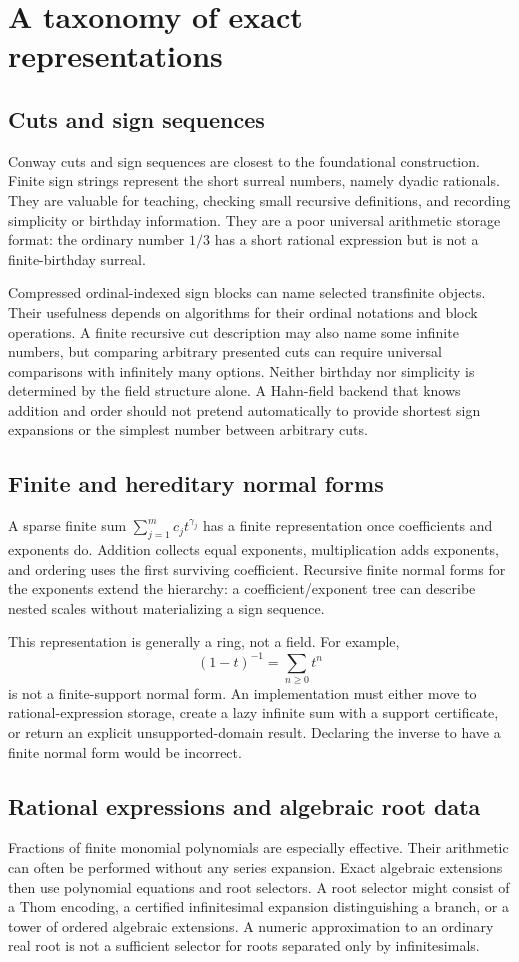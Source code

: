 \documentclass[11pt,letterpaper]{article}
\theoremstyle{definition}
\numberwithin{equation}{section}
\begin{document}
\section{A taxonomy of exact representations}\label{sec:representations}
\subsection{Cuts and sign sequences}
Conway cuts and sign sequences are closest to the foundational construction. Finite sign strings represent the short surreal numbers, namely dyadic rationals. They are valuable for teaching, checking small recursive definitions, and recording simplicity or birthday information. They are a poor universal arithmetic storage format: the ordinary number $1/3$ has a short rational expression but is not a finite-birthday surreal.

Compressed ordinal-indexed sign blocks can name selected transfinite objects. Their usefulness depends on algorithms for their ordinal notations and block operations. A finite recursive cut description may also name some infinite numbers, but comparing arbitrary presented cuts can require universal comparisons with infinitely many options. Neither birthday nor simplicity is determined by the field structure alone. A Hahn-field backend that knows addition and order should not pretend automatically to provide shortest sign expansions or the simplest number between arbitrary cuts.

\subsection{Finite and hereditary normal forms}
A sparse finite sum $\sum_{j=1}^m c_jt^{\gamma_j}$ has a finite representation once coefficients and exponents do. Addition collects equal exponents, multiplication adds exponents, and ordering uses the first surviving coefficient. Recursive finite normal forms for the exponents extend the hierarchy: a coefficient/exponent tree can describe nested scales without materializing a sign sequence.

This representation is generally a ring, not a field. For example,
\[
 (1-t)^{-1}=\sum_{n\ge0}t^n
\]
is not a finite-support normal form. An implementation must either move to rational-expression storage, create a lazy infinite sum with a support certificate, or return an explicit unsupported-domain result. Declaring the inverse to have a finite normal form would be incorrect.

\subsection{Rational expressions and algebraic root data}
Fractions of finite monomial polynomials are especially effective. Their arithmetic can often be performed without any series expansion. Exact algebraic extensions then use polynomial equations and root selectors. A root selector might consist of a Thom encoding, a certified infinitesimal expansion distinguishing a branch, or a tower of ordered algebraic extensions. A numeric approximation to an ordinary real root is not a sufficient selector for roots separated only by infinitesimals.
\end{document}
